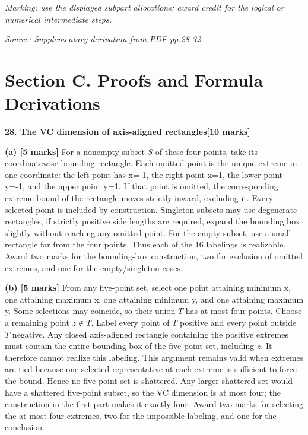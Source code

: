 \documentclass[11pt,a4paper]{article}
\begin{document}
\textit{Marking: use the displayed subpart allocations; award credit for the logical or numerical intermediate steps.}\par
{\footnotesize\textit{Source: Supplementary derivation from PDF pp.28-32.}}
\newpage\section*{Section C. Proofs and Formula Derivations}
\textbf{28. The VC dimension of axis-aligned rectangles}\hfill\textbf{[10 marks]}\par\medskip
\textbf{(a) [5 marks]} For a nonempty subset \(S\) of these four points, take its coordinatewise bounding rectangle. Each omitted point is the unique extreme in one coordinate: the left point has x=-1, the right point x=1, the lower point y=-1, and the upper point y=1. If that point is omitted, the corresponding extreme bound of the rectangle moves strictly inward, excluding it. Every selected point is included by construction. Singleton subsets may use degenerate rectangles; if strictly positive side lengths are required, expand the bounding box slightly without reaching any omitted point. For the empty subset, use a small rectangle far from the four points. Thus each of the 16 labelings is realizable. Award two marks for the bounding-box construction, two for exclusion of omitted extremes, and one for the empty/singleton cases.

\textbf{(b) [5 marks]} From any five-point set, select one point attaining minimum x, one attaining maximum x, one attaining minimum y, and one attaining maximum y. Some selections may coincide, so their union \(T\) has at most four points. Choose a remaining point \(z\notin T\). Label every point of \(T\) positive and every point outside \(T\) negative. Any closed axis-aligned rectangle containing the positive extremes must contain the entire bounding box of the five-point set, including \(z\). It therefore cannot realize this labeling. This argument remains valid when extremes are tied because one selected representative at each extreme is sufficient to force the bound. Hence no five-point set is shattered. Any larger shattered set would have a shattered five-point subset, so the VC dimension is at most four; the construction in the first part makes it exactly four. Award two marks for selecting the at-most-four extremes, two for the impossible labeling, and one for the conclusion.
\end{document}
